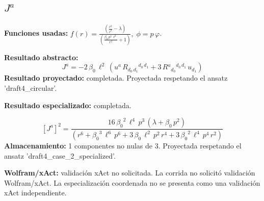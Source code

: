 \documentclass[11pt]{article}
\begin{document}
\subsection*{$ J^a $}
\textbf{Funciones usadas:} $ f\!\left(r\right) = \frac{\left(\frac{{r}^{2}}{{\ell}^{2}} - \lambda\right)}{\left(\frac{\beta_{0}\,{p}^{2}\,{\ell}^{2}}{{r}^{2}} + 1\right)},\;\phi=p\,\varphi $.\par
\textbf{Resultado abstracto:}
\begin{dmath*}[breakdepth={5}]
J^a = -2\,\beta_{0}\,{\ell}^{2}\,\left(u{}^{a}\,R{}_{d_{0}\,d_{1}}{}^{d_{0}\,d_{1}} + 3\,R{}^{a}{}_{d_{0}}{}^{d_{0}\,d_{1}}\,u{}_{d_{1}}\right)
\end{dmath*}
\textbf{Resultado proyectado:} completada. Proyectada respetando el ansatz 'draft4\_circular'.\par
\textbf{Resultado especializado:} completada.\par
\begin{dmath*}[breakdepth={5}]
\left[J^a\right]^{2} = \frac{16\,{\beta_{0}}^{2}\,{\ell}^{4}\,{p}^{3}\,\left(\lambda + \beta_{0}\,{p}^{2}\right)}{\left({r}^{6} + {\beta_{0}}^{3}\,{\ell}^{6}\,{p}^{6} + 3\,\beta_{0}\,{\ell}^{2}\,{p}^{2}\,{r}^{4} + 3\,{\beta_{0}}^{2}\,{\ell}^{4}\,{p}^{4}\,{r}^{2}\right)}
\end{dmath*}
\textbf{Almacenamiento:} 1 componentes no nulas de 3. Proyectada respetando el ansatz 'draft4\_case\_2\_specialized'.\par
\textbf{Wolfram/xAct:} validación xAct no solicitada. La corrida no solicitó validación Wolfram/xAct. La especialización coordenada no se presenta como una validación xAct independiente.\par\medskip
{}
\end{document}

